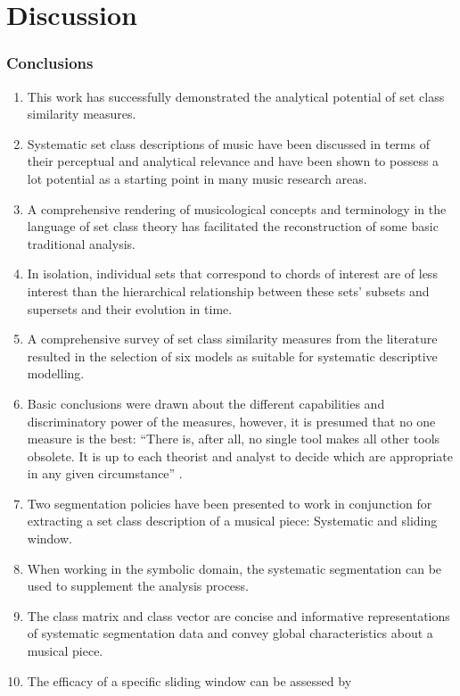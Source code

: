 \documentclass{article}
\begin{document}
\clearpage
\part{Discussion}
\section{Conclusions}
\label{sec-9}

\begin{enumerate}
\item This work has successfully demonstrated the analytical potential of
   set class similarity measures.
\item Systematic set class descriptions of music have been discussed in
   terms of their perceptual and analytical relevance and have been
   shown to possess a lot potential as a starting point in many music
   research areas.
\item A comprehensive rendering of musicological concepts and
   terminology in the language of set class theory has facilitated the
   reconstruction of some basic traditional analysis.
\item In isolation, individual sets that correspond to chords of interest
   are of less interest than the hierarchical relationship between
   these sets' subsets and supersets and their evolution in time.
\item A comprehensive survey of set class similarity measures from the
   literature resulted in the selection of six models as suitable
   for systematic descriptive modelling.
\item Basic conclusions were drawn about the different capabilities and
   discriminatory power of the measures, however, it is presumed that
   no one measure is the best: ``There is, after all, no single tool
   makes all other tools obsolete. It is up to each theorist and
   analyst to decide which are appropriate in any given circumstance''
   \citep{Buchler1997}.
\item Two segmentation policies have been presented to work in
   conjunction for extracting a set class description of a musical
   piece: Systematic and sliding window.
\item When working in the symbolic domain, the systematic segmentation
   can be used to supplement the analysis process.
\item The class matrix and class vector are concise and informative
   representations of systematic segmentation data and convey global
   characteristics about a musical piece.
\item The efficacy of a specific sliding window can be assessed by

\end{enumerate}
\end{document}
